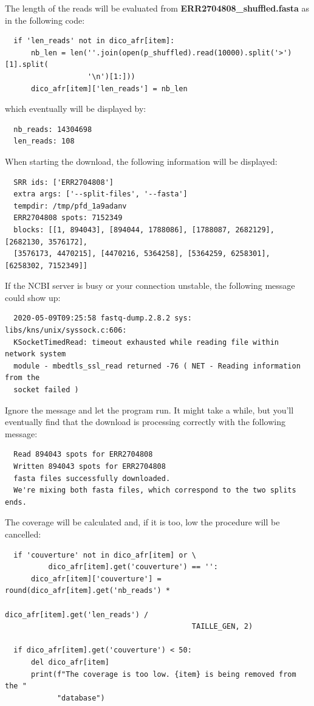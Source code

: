 \documentclass[twoside,a4paper,11pt,frenchb,openany]{report}
\begin{document}
    The length of the reads will be evaluated from
\textbf{ERR2704808\_shuffled.fasta} as in the following code:

\begin{verbatim}
  if 'len_reads' not in dico_afr[item]:
      nb_len = len(''.join(open(p_shuffled).read(10000).split('>')[1].split(
                   '\n')[1:]))
      dico_afr[item]['len_reads'] = nb_len
\end{verbatim}

    which eventually will be displayed by:

    \begin{verbatim}
  nb_reads: 14304698
  len_reads: 108
\end{verbatim}

    When starting the download, the following information will be displayed:

    \begin{verbatim}
  SRR ids: ['ERR2704808']
  extra args: ['--split-files', '--fasta']
  tempdir: /tmp/pfd_1a9adanv
  ERR2704808 spots: 7152349
  blocks: [[1, 894043], [894044, 1788086], [1788087, 2682129], [2682130, 3576172], 
  [3576173, 4470215], [4470216, 5364258], [5364259, 6258301], [6258302, 7152349]]
\end{verbatim}

    If the NCBI server is busy or your connection unstable, the following
message could show up:

    \begin{verbatim}
  2020-05-09T09:25:58 fastq-dump.2.8.2 sys: libs/kns/unix/syssock.c:606:
  KSocketTimedRead: timeout exhausted while reading file within network system 
  module - mbedtls_ssl_read returned -76 ( NET - Reading information from the 
  socket failed )
\end{verbatim}

    Ignore the message and let the program run. It might take a while, but
you'll eventually find that the download is processing correctly with
the following message:

    \begin{verbatim}
  Read 894043 spots for ERR2704808
  Written 894043 spots for ERR2704808
  fasta files successfully downloaded.
  We're mixing both fasta files, which correspond to the two splits ends.
\end{verbatim}

    The coverage will be calculated and, if it is too, low the procedure
will be cancelled:

 \begin{verbatim}
  if 'couverture' not in dico_afr[item] or \
          dico_afr[item].get('couverture') == '':
      dico_afr[item]['couverture'] = round(dico_afr[item].get('nb_reads') *
                                           dico_afr[item].get('len_reads') /
                                           TAILLE_GEN, 2)
        
  if dico_afr[item].get('couverture') < 50:
      del dico_afr[item]
      print(f"The coverage is too low. {item} is being removed from the "
            "database")
\end{verbatim}
\end{document}
